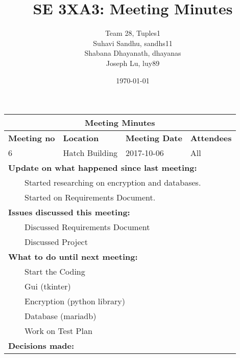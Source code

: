 \documentclass{article}
\title{SE 3XA3: Meeting Minutes}
\author{Team 28, Tuples1
		\\ Suhavi Sandhu, sandhs11
		\\ Shabana Dhayanath, dhayanas
		\\ Joseph Lu, luy89
}
\date{\today}
\newcommand{\tabitem}{~~\llap{\textbullet}~~}
\begin{document}
\begin{tabularx}{\textwidth}{ |X||X||X||X| }
    \hline
    \hline
        \multicolumn{4}{|c|}{\textbf{Meeting Minutes}} \\ 
    \hline
    \hline

    \textbf{Meeting no} & \textbf{Location} & \textbf{Meeting Date} & \textbf{Attendees}\\
    \hline

    6 & Hatch Building & 2017-10-06 & All\\

    \hline

    \multicolumn{4}{|l|}{\textbf{Update on what happened since last meeting: }} \\
		
	\multicolumn{4}{|l|}{\tabitem Started researching on encryption and databases.}\\
	\multicolumn{4}{|l|}{\tabitem Started on Requirements Document.}\\

    \hline
    
    \multicolumn{4}{|l|}{\textbf{Issues discussed this meeting: }}\\

    \multicolumn{4}{|l|}{\tabitem Discussed Requirements Document}\\
    \multicolumn{4}{|l|}{\tabitem Discussed Project}\\ 

    \hline

    \multicolumn{4}{|l|}{\textbf{What to do until next meeting: }} \\

    \multicolumn{4}{|l|}{\tabitem Start the Coding}\\
	    \multicolumn{4}{|l|}{\quad\tabitem Gui (tkinter)}\\
		\multicolumn{4}{|l|}{\quad\tabitem Encryption (python library)}\\
		\multicolumn{4}{|l|}{\quad\tabitem Database (mariadb)}\\
	\multicolumn{4}{|l|}{\tabitem Work on Test Plan}\\

    \hline
        \multicolumn{4}{|l|}{\textbf{Decisions made: }} \\
    \hline
\end{tabularx}
\end{document}
